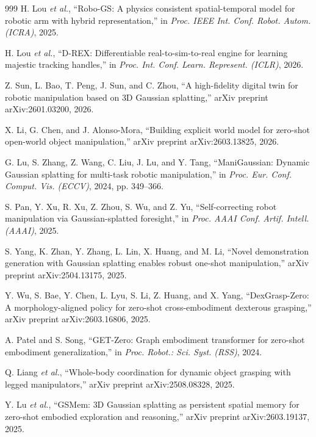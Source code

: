 \documentclass[12pt,a4paper,oneside]{report}
\begin{document}
\begin{thebibliography}{999}
H. Lou \textit{et al.}, ``{Robo-GS}: A physics consistent spatial-temporal model for robotic arm with hybrid representation,'' in \textit{Proc. IEEE Int. Conf. Robot. Autom. (ICRA)}, 2025.

H. Lou \textit{et al.}, ``D-REX: Differentiable real-to-sim-to-real engine for learning majestic tracking handles,'' in \textit{Proc. Int. Conf. Learn. Represent. (ICLR)}, 2026.

Z. Sun, L. Bao, T. Peng, J. Sun, and C. Zhou, ``A high-fidelity digital twin for robotic manipulation based on {3D} Gaussian splatting,'' arXiv preprint arXiv:2601.03200, 2026.

X. Li, G. Chen, and J. Alonso-Mora, ``Building explicit world model for zero-shot open-world object manipulation,'' arXiv preprint arXiv:2603.13825, 2026.

G. Lu, S. Zhang, Z. Wang, C. Liu, J. Lu, and Y. Tang, ``{ManiGaussian}: Dynamic Gaussian splatting for multi-task robotic manipulation,'' in \textit{Proc. Eur. Conf. Comput. Vis. (ECCV)}, 2024, pp. 349--366.

S. Pan, Y. Xu, R. Xu, Z. Zhou, S. Wu, and Z. Yu, ``Self-correcting robot manipulation via Gaussian-splatted foresight,'' in \textit{Proc. AAAI Conf. Artif. Intell. (AAAI)}, 2025.

S. Yang, K. Zhan, Y. Zhang, L. Lin, X. Huang, and M. Li, ``Novel demonstration generation with Gaussian splatting enables robust one-shot manipulation,'' arXiv preprint arXiv:2504.13175, 2025.

Y. Wu, S. Bae, Y. Chen, L. Lyu, S. Li, Z. Huang, and X. Yang, ``{DexGrasp-Zero}: A morphology-aligned policy for zero-shot cross-embodiment dexterous grasping,'' arXiv preprint arXiv:2603.16806, 2025.

A. Patel and S. Song, ``{GET-Zero}: Graph embodiment transformer for zero-shot embodiment generalization,'' in \textit{Proc. Robot.: Sci. Syst. (RSS)}, 2024.

Q. Liang \textit{et al.}, ``Whole-body coordination for dynamic object grasping with legged manipulators,'' arXiv preprint arXiv:2508.08328, 2025.

Y. Lu \textit{et al.}, ``{GSMem}: {3D} Gaussian splatting as persistent spatial memory for zero-shot embodied exploration and reasoning,'' arXiv preprint arXiv:2603.19137, 2025.


\end{thebibliography}
\end{document}
